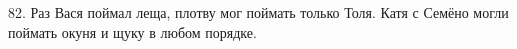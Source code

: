 82. Раз Вася поймал леща, плотву мог поймать только Толя. Катя с Семёно могли поймать окуня и щуку в любом порядке.\\
